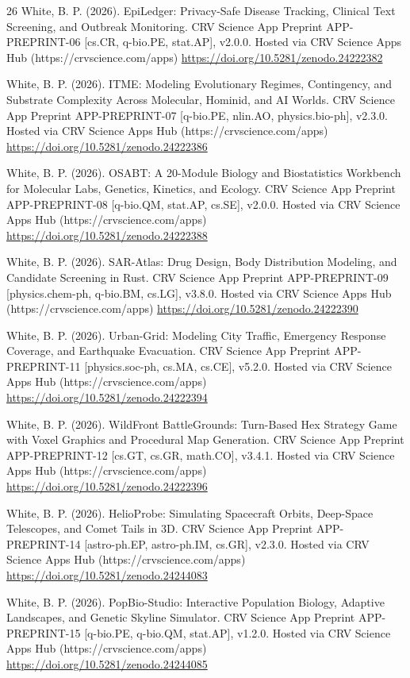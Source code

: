 \documentclass[10pt,letterpaper]{article}
\begin{document}
\begin{thebibliography}{26}
 White, B. P. (2026). EpiLedger: Privacy-Safe Disease Tracking, Clinical Text Screening, and Outbreak Monitoring. CRV Science App Preprint APP-PREPRINT-06 [cs.CR, q-bio.PE, stat.AP], v2.0.0. Hosted via CRV Science Apps Hub (https://crvscience.com/apps) \url{https://doi.org/10.5281/zenodo.24222382}

 White, B. P. (2026). ITME: Modeling Evolutionary Regimes, Contingency, and Substrate Complexity Across Molecular, Hominid, and AI Worlds. CRV Science App Preprint APP-PREPRINT-07 [q-bio.PE, nlin.AO, physics.bio-ph], v2.3.0. Hosted via CRV Science Apps Hub (https://crvscience.com/apps) \url{https://doi.org/10.5281/zenodo.24222386}

 White, B. P. (2026). OSABT: A 20-Module Biology and Biostatistics Workbench for Molecular Labs, Genetics, Kinetics, and Ecology. CRV Science App Preprint APP-PREPRINT-08 [q-bio.QM, stat.AP, cs.SE], v2.0.0. Hosted via CRV Science Apps Hub (https://crvscience.com/apps) \url{https://doi.org/10.5281/zenodo.24222388}

 White, B. P. (2026). SAR-Atlas: Drug Design, Body Distribution Modeling, and Candidate Screening in Rust. CRV Science App Preprint APP-PREPRINT-09 [physics.chem-ph, q-bio.BM, cs.LG], v3.8.0. Hosted via CRV Science Apps Hub (https://crvscience.com/apps) \url{https://doi.org/10.5281/zenodo.24222390}

 White, B. P. (2026). Urban-Grid: Modeling City Traffic, Emergency Response Coverage, and Earthquake Evacuation. CRV Science App Preprint APP-PREPRINT-11 [physics.soc-ph, cs.MA, cs.CE], v5.2.0. Hosted via CRV Science Apps Hub (https://crvscience.com/apps) \url{https://doi.org/10.5281/zenodo.24222394}

 White, B. P. (2026). WildFront BattleGrounds: Turn-Based Hex Strategy Game with Voxel Graphics and Procedural Map Generation. CRV Science App Preprint APP-PREPRINT-12 [cs.GT, cs.GR, math.CO], v3.4.1. Hosted via CRV Science Apps Hub (https://crvscience.com/apps) \url{https://doi.org/10.5281/zenodo.24222396}

 White, B. P. (2026). HelioProbe: Simulating Spacecraft Orbits, Deep-Space Telescopes, and Comet Tails in 3D. CRV Science App Preprint APP-PREPRINT-14 [astro-ph.EP, astro-ph.IM, cs.GR], v2.3.0. Hosted via CRV Science Apps Hub (https://crvscience.com/apps) \url{https://doi.org/10.5281/zenodo.24244083}

 White, B. P. (2026). PopBio-Studio: Interactive Population Biology, Adaptive Landscapes, and Genetic Skyline Simulator. CRV Science App Preprint APP-PREPRINT-15 [q-bio.PE, q-bio.QM, stat.AP], v1.2.0. Hosted via CRV Science Apps Hub (https://crvscience.com/apps) \url{https://doi.org/10.5281/zenodo.24244085}


\end{thebibliography}
\end{document}
